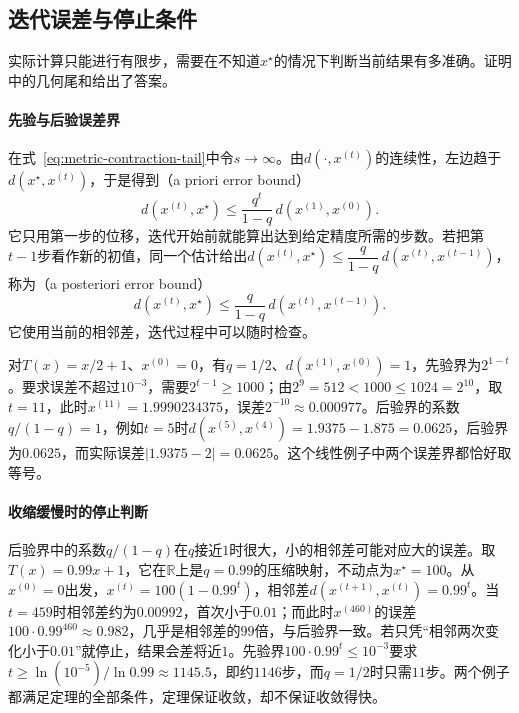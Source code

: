 \subsection{迭代误差与停止条件}
\label{sec:metric-contraction-error}

实际计算只能进行有限步，需要在不知道$x^\star$的情况下判断当前结果有多准确。证明中的几何尾和给出了答案。

\paragraph{先验与后验误差界}
在式~\eqref{eq:metric-contraction-tail}中令$s\to\infty$。由$d(\cdot,x^{(t)})$的连续性，左边趋于$d(x^\star,x^{(t)})$，于是得到（a priori error bound）
\begin{equation}
\label{eq:metric-a-priori}
  d(x^{(t)},x^\star)\leq\frac{q^t}{1-q}\,d(x^{(1)},x^{(0)}).
\end{equation}
它只用第一步的位移，迭代开始前就能算出达到给定精度所需的步数。若把第$t-1$步看作新的初值，同一个估计给出$d(x^{(t)},x^\star)\leq\dfrac{q}{1-q}\,d(x^{(t)},x^{(t-1)})$，称为（a posteriori error bound）
\begin{equation}
\label{eq:metric-a-posteriori}
  d(x^{(t)},x^\star)\leq\frac{q}{1-q}\,d(x^{(t)},x^{(t-1)}).
\end{equation}
它使用当前的相邻差，迭代过程中可以随时检查。

\begin{example}[按目标精度停止]
\label{ex:metric-contraction-stop}
对$T(x)=x/2+1$、$x^{(0)}=0$，有$q=1/2$、$d(x^{(1)},x^{(0)})=1$，先验界为$2^{1-t}$。要求误差不超过$10^{-3}$，需要$2^{t-1}\geq1000$；由$2^9=512<1000\leq1024=2^{10}$，取$t=11$，此时$x^{(11)}=1.9990234375$，误差$2^{-10}\approx0.000977$。后验界的系数$q/(1-q)=1$，例如$t=5$时$d(x^{(5)},x^{(4)})=1.9375-1.875=0.0625$，后验界为$0.0625$，而实际误差$|1.9375-2|=0.0625$。这个线性例子中两个误差界都恰好取等号。
\end{example}

\paragraph{收缩缓慢时的停止判断}
后验界中的系数$q/(1-q)$在$q$接近$1$时很大，小的相邻差可能对应大的误差。取$T(x)=0.99x+1$，它在$\mathbb R$上是$q=0.99$的压缩映射，不动点为$x^\star=100$。从$x^{(0)}=0$出发，$x^{(t)}=100(1-0.99^t)$，相邻差$d(x^{(t+1)},x^{(t)})=0.99^t$。当$t=459$时相邻差约为$0.00992$，首次小于$0.01$；而此时$x^{(460)}$的误差$100\cdot0.99^{460}\approx0.982$，几乎是相邻差的$99$倍，与后验界一致。若只凭“相邻两次变化小于$0.01$”就停止，结果会差将近$1$。先验界$100\cdot0.99^t\leq10^{-3}$要求$t\geq\ln(10^{-5})/\ln0.99\approx1145.5$，即约$1146$步，而$q=1/2$时只需$11$步。两个例子都满足定理的全部条件，定理保证收敛，却不保证收敛得快。

